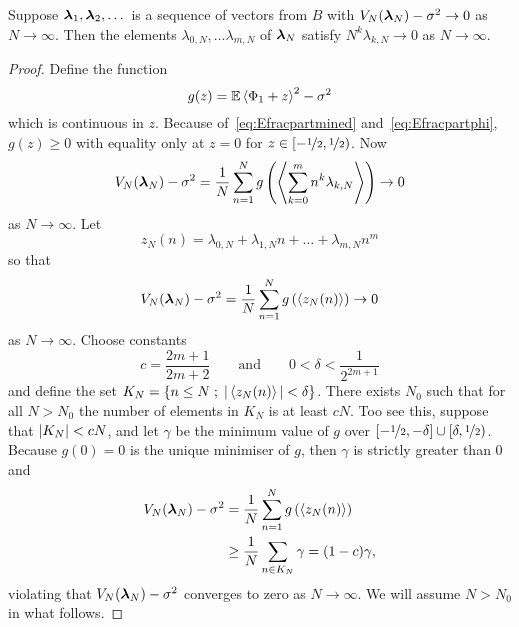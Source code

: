 \documentclass[journal]{IEEEtran}
\begin{document}
\begin{lemma}\label{lem:moran2}
Suppose $\boldsymbol{\lambda}_1, \boldsymbol{\lambda}_2,\dots$ is a sequence of vectors from $B$ with $V_N(\boldsymbol{\lambda}_N) - \sigma^2\rightarrow 0$ as $N\rightarrow\infty$. Then the elements $\lambda_{0,N}, \dots \lambda_{m,N}$ of $\boldsymbol{\lambda}_N$ satisfy $N^k\lambda_{k, N}\rightarrow0$ as $N\rightarrow\infty$.
\end{lemma}
\begin{proof}
Define the function
\begin{equation}\label{eq:gz}
g(z) = \expect\fracpart{\Phi_1 + z}^2 - \sigma^2
\end{equation}
which is continuous in $z$. Because of~\eqref{eq:Efracpartmined} and~\eqref{eq:Efracpartphi}, $g(z) \geq 0$ with equality only at $z = 0$ for $z \in [-\nicefrac{1}{2}, \nicefrac{1}{2})$. Now
\[
V_N(\boldsymbol{\lambda}_N) - \sigma^2 = \frac{1}{N}\sum_{n=1}^{N} g\left( \left\langle  \sum_{k=0}^{m}{n^k \lambda_{k,N}}  \right\rangle \right) \rightarrow 0
\]
as $N \rightarrow \infty$. Let
\[
z_N(n) = \lambda_{0,N} + \lambda_{1,N} n + \dots + \lambda_{m,N} n^m
\]
so that 
\[
V_N(\boldsymbol{\lambda}_N) - \sigma^2 = \frac{1}{N}\sum_{n=1}^{N} g\left( \left\langle z_N(n) \right\rangle \right) \rightarrow 0
\] 
as $N \rightarrow \infty$.
Choose constants 
\[
c = \frac{2m+1}{2m+2} \qquad \text{and} \qquad 0 < \delta < \frac{1}{2^{2m+1}}
\]
and define the set $K_{N}=\left\{  n\leq N \; ; \; \vert \left\langle z_N(n) \right\rangle \vert < \delta \right\}$.  There exists $N_0$ such that for all $N > N_0$ the number of elements in $K_N$ is at least $cN$.  Too see this, suppose that $\vert K_N \vert < cN$, and let $\gamma$ be the minimum value of $g$ over $[-\nicefrac{1}{2},-\delta] \cup [\delta, \nicefrac{1}{2})$. Because $g(0) = 0$ is the unique minimiser of $g$, then $\gamma$ is strictly greater than $0$ and
\begin{align*}
V_N(\boldsymbol{\lambda}_N) - \sigma^2 &= \frac{1}{N}\sum_{n=1}^{N} g\left( \left\langle z_N(n) \right\rangle \right) \\
&\geq \frac{1}{N}\sum_{n\in K_N} \gamma = (1-c)\gamma,
\end{align*}
violating that $V_N(\boldsymbol{\lambda}_N) - \sigma^2$ converges to zero as $N \rightarrow \infty$.  We will assume $N > N_0$ in what follows.


\end{proof}
\end{document}
